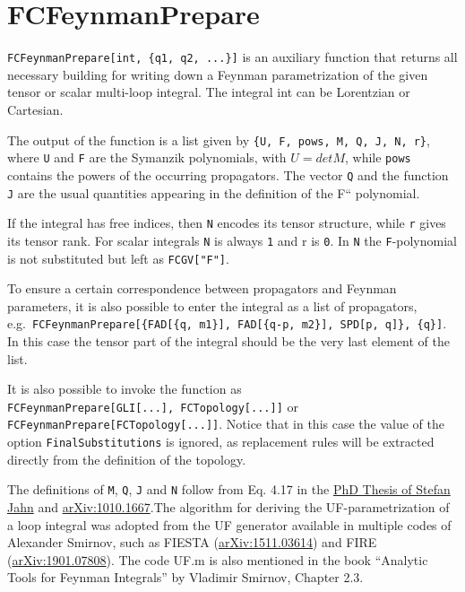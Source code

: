 \documentclass[../FeynCalcManual.tex]{subfiles}
\begin{document}
\hypertarget{fcfeynmanprepare}{%
\section{FCFeynmanPrepare}\label{fcfeynmanprepare}}

\texttt{FCFeynmanPrepare[\allowbreak{}int,\ \allowbreak{}\{\allowbreak{}q1,\ \allowbreak{}q2,\ \allowbreak{}...\}]}
is an auxiliary function that returns all necessary building for writing
down a Feynman parametrization of the given tensor or scalar multi-loop
integral. The integral int can be Lorentzian or Cartesian.

The output of the function is a list given by
\texttt{\{\allowbreak{}U,\ \allowbreak{}F,\ \allowbreak{}pows,\ \allowbreak{}M,\ \allowbreak{}Q,\ \allowbreak{}J,\ \allowbreak{}N,\ \allowbreak{}r\}},
where \texttt{U} and \texttt{F} are the Symanzik polynomials, with
\(U = det M\), while \texttt{pows} contains the powers of the occurring
propagators. The vector \texttt{Q} and the function \texttt{J} are the
usual quantities appearing in the definition of the F`` polynomial.

If the integral has free indices, then \texttt{N} encodes its tensor
structure, while \texttt{r} gives its tensor rank. For scalar integrals
\texttt{N} is always \texttt{1} and r is \texttt{0}. In \texttt{N} the
\texttt{F}-polynomial is not substituted but left as
\texttt{FCGV[\allowbreak{}"F"]}.

To ensure a certain correspondence between propagators and Feynman
parameters, it is also possible to enter the integral as a list of
propagators,
e.g.~\texttt{FCFeynmanPrepare[\allowbreak{}\{\allowbreak{}FAD[\allowbreak{}\{\allowbreak{}q,\ \allowbreak{}m1\}],\ \allowbreak{}FAD[\allowbreak{}\{\allowbreak{}q-p,\ \allowbreak{}m2\}],\ \allowbreak{}SPD[\allowbreak{}p,\ \allowbreak{}q]\},\ \allowbreak{}\{\allowbreak{}q\}]}.
In this case the tensor part of the integral should be the very last
element of the list.

It is also possible to invoke the function as
\texttt{FCFeynmanPrepare[\allowbreak{}GLI[\allowbreak{}...],\ \allowbreak{}FCTopology[\allowbreak{}...]]}
or \texttt{FCFeynmanPrepare[\allowbreak{}FCTopology[\allowbreak{}...]]}.
Notice that in this case the value of the option
\texttt{FinalSubstitutions} is ignored, as replacement rules will be
extracted directly from the definition of the topology.

The definitions of \texttt{M}, \texttt{Q}, \texttt{J} and \texttt{N}
follow from Eq. 4.17 in the
\href{http://mediatum.ub.tum.de/?id=1524691}{PhD Thesis of Stefan Jahn}
and \href{https://arxiv.org/abs/1010.1667}{arXiv:1010.1667}.The
algorithm for deriving the UF-parametrization of a loop integral was
adopted from the UF generator available in multiple codes of Alexander
Smirnov, such as FIESTA
(\href{https://arxiv.org/abs/1511.03614}{arXiv:1511.03614}) and FIRE
(\href{https://arxiv.org/abs/1901.07808}{arXiv:1901.07808}). The code
UF.m is also mentioned in the book ``Analytic Tools for Feynman
Integrals'' by Vladimir Smirnov, Chapter 2.3.
\end{document}

